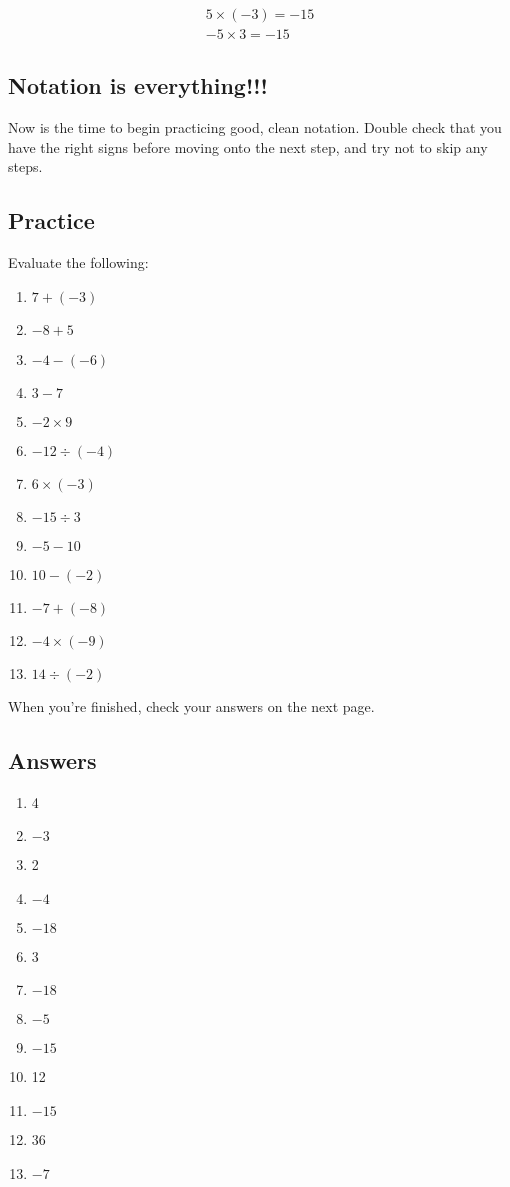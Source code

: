 \documentclass[a4paper, 12pt]{article}
\begin{document}
\begin{gather*}
5 \times (-3) = -15 \\
-5 \times 3 = -15
\end{gather*}

\subsection*{Notation is everything!!!}

Now is the time to begin practicing good, clean notation. Double check that you have the right signs before moving onto the next step, and try not to skip any steps.

\newpage

\subsection*{Practice}

Evaluate the following:

\begin{enumerate}[label=\alph*)]
\item $7 + (-3)$
\item $-8 + 5$
\item $-4 - (-6)$
\item $3 - 7$
\item $-2 \times 9$
\item $-12 \div (-4)$
\item $6 \times (-3)$
\item $-15 \div 3$
\item $-5 - 10$
\item $10 - (-2)$
\item $-7 + (-8)$
\item $-4 \times (-9)$
\item $14 \div (-2)$
\end{enumerate}

When you're finished, check your answers on the next page.

\newpage

\subsection*{Answers}

\begin{enumerate}[label=\alph*)]
\item 4
\item $-3$
\item 2
\item $-4$
\item $-18$
\item 3
\item $-18$
\item $-5$
\item $-15$
\item 12
\item $-15$
\item 36
\item $-7$
\end{enumerate}

\newpage
\end{document}

